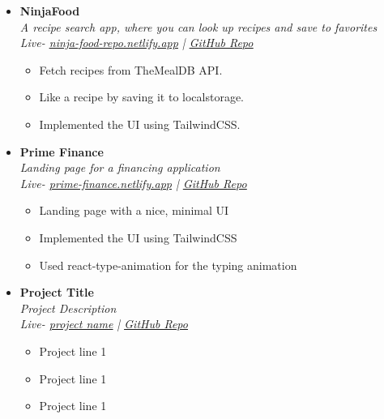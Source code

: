 \documentclass[11pt, oneside, a4paper, titlepage]{article}
\newcommand\experienceVSpace{\vspace{-0.1cm}}
\begin{document}
\begin{tcolorbox}
\begin{minipage}[t]{11cm}
\begin{tcolorbox}[grow to right by=0.75cm,colframe=white,colback=white]
\begin{itemize}
        \item
        {
          \textbf{NinjaFood} \\
          \textit{A recipe search app, where you can look up recipes and save to favorites} \\
          \textit{Live- \href{https://ninja-food-repo.netlify.app}{\underline{ninja-food-repo.netlify.app}} | \href{https://github.com/SazedWorldbringer/ninjafood}{\underline{GitHub Repo}}} \\
          \vspace*{-0.7cm}
          \begin{itemize}
            \item Fetch recipes from TheMealDB API.
              \experienceVSpace
            \item Like a recipe by saving it to localstorage.
              \experienceVSpace
            \item Implemented the UI using TailwindCSS.
          \end{itemize}
        }

        \item
        {
          \textbf{Prime Finance} \\
          \textit{Landing page for a financing application} \\
          \textit{Live- \href{https://prime-finance.netlify.app}{\underline{prime-finance.netlify.app}} | \href{https://github.com/SazedWorldbringer/prime-finance-react}{\underline{GitHub Repo}}} \\
          \vspace*{-0.7cm}
          \begin{itemize}
            \item Landing page with a nice, minimal UI
              \experienceVSpace
            \item Implemented the UI using TailwindCSS
              \experienceVSpace
            \item Used react-type-animation for the typing animation
          \end{itemize}
        }

        \item
        {
          \textbf{Project Title} \\
          \textit{Project Description} \\
          \textit{Live- \href{url}{\underline{project name}} | \href{https://github.com/SazedWorldbringer}{\underline{GitHub Repo}}} \\
          \vspace*{-0.7cm}
          \begin{itemize}
            \item Project line 1
              \experienceVSpace
            \item Project line 1
              \experienceVSpace
            \item Project line 1
          \end{itemize}
        }
      \end{itemize}

\end{tcolorbox}
\end{minipage}
\end{tcolorbox}
\end{document}
